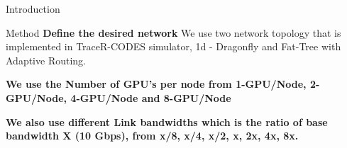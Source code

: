 \documentclass[final]{beamer}
\newlength{\onecolwid}
\begin{document}
\begin{frame}[t]
\begin{columns}[t]
\begin{column}{\onecolwid}
\begin{block}{Introduction}
\end{block}
\vspace{-1em}
\begin{block}{Method}
\textbf{Define the desired network} \newline We use two network topology that is implemented in TraceR-CODES simulator, 1d - Dragonfly and Fat-Tree with Adaptive Routing.

\newline
\textbf{We use the Number of GPU's per node from 1-GPU/Node, 2-GPU/Node, 4-GPU/Node and 8-GPU/Node}

\newline
\textbf{We also use different Link bandwidths which is the ratio of base bandwidth X (10 Gbps), from x/8, x/4, x/2, x, 2x, 4x, 8x.}






\end{block}
\end{column}
\end{columns}
\end{frame}
\end{document}
